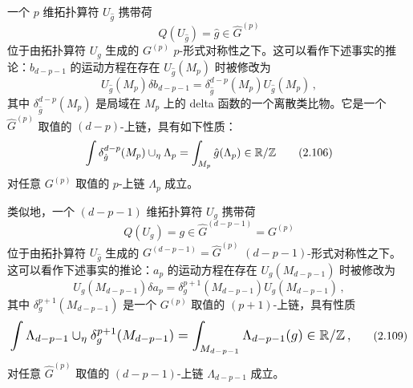  一个 $p$ 维拓扑算符 $U_{\hat{g}}$ 携带荷
\begin{equation}
  Q(U_{\hat{g}}) = \hat{g}\in\widehat{G}^{(p)} \tag{2.104}
\end{equation}
位于由拓扑算符 $U_g$ 生成的 $G^{(p)}$ $p$-形式对称性之下。这可以看作下述事实的推论：$b_{d-p-1}$ 的运动方程在存在 $U_{\hat{g}}(M_p)$ 时被修改为
\begin{equation}
  U_{\hat{g}}(M_p)\delta b_{d-p-1} = \delta^{d-p}_{\hat{g}}(M_p)U_{\hat{g}}(M_p)\,, \tag{2.105}
\end{equation}
其中 $\delta^{d-p}_{\hat{g}}(M_p)$ 是局域在 $M_p$ 上的 delta 函数的一个离散类比物。它是一个 $\widehat{G}^{(p)}$ 取值的 $(d-p)$-上链，具有如下性质：
\begin{equation}
  \int\delta^{d-p}_{\hat{g}}(M_p)\cup_\eta\Lambda_p = \int_{M_p}\hat{g}(\Lambda_p)\in\mathbb{R}/\mathbb{Z} \tag{2.106}
\end{equation}
对任意 $G^{(p)}$ 取值的 $p$-上链 $\Lambda_p$ 成立。


类似地，一个 $(d-p-1)$ 维拓扑算符 $U_g$ 携带荷
\begin{equation}
  Q(U_g) = g\in\widehat{G}^{(d-p-1)} = G^{(p)} \tag{2.107}
\end{equation}
位于由拓扑算符 $U_{\hat{g}}$ 生成的 $G^{(d-p-1)}=\widehat{G}^{(p)}$ $(d-p-1)$-形式对称性之下。这可以看作下述事实的推论：$a_p$ 的运动方程在存在 $U_g(M_{d-p-1})$ 时被修改为
\begin{equation}
  U_g(M_{d-p-1})\delta a_p = \delta^{p+1}_{g}(M_{d-p-1})U_g(M_{d-p-1})\,, \tag{2.108}
\end{equation}
其中 $\delta^{p+1}_{g}(M_{d-p-1})$ 是一个 $G^{(p)}$ 取值的 $(p+1)$-上链，具有性质
\begin{equation}
  \resizebox{0.88\textwidth}{!}{$\displaystyle \int\Lambda_{d-p-1}\cup_\eta\delta^{p+1}_{g}(M_{d-p-1}) = \int_{M_{d-p-1}}\Lambda_{d-p-1}(g)\in\R/\Z\,,$} \tag{2.109}
\end{equation}
对任意 $\widehat{G}^{(p)}$ 取值的 $(d-p-1)$-上链 $\Lambda_{d-p-1}$ 成立。



